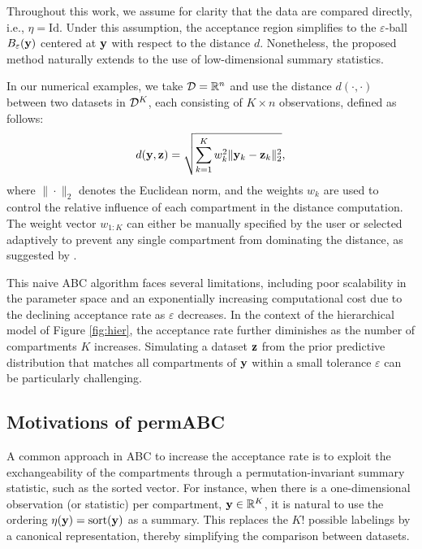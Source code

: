 Throughout this work, we assume for clarity that the data are compared directly, i.e., $\eta = \mathrm{Id}$. Under this assumption, the acceptance region simplifies to the $\varepsilon$-ball $B_{\varepsilon}(\mathbf{y})$ centered at $\mathbf{y}$ with respect to the distance $d$. Nonetheless, the proposed method naturally extends to the use of low-dimensional summary statistics.


In our numerical examples, we take $\mathcal{D} = \mathbb R^n$ and use the distance $d(\cdot,\cdot)$ between two datasets in \( \mathcal{D}^K \), each consisting of \( K \times n \) observations, defined as follows: 
\begin{equation}
    \label{eqdistance}
    d(\mathbf{y}, \mathbf{z}) = \sqrt{\sum_{k=1}^K w_k^2 \| \mathbf{y}_k - \mathbf{z}_k \|_2^2},
\end{equation}
where \( \| \cdot \|_2 \) denotes the Euclidean norm, and the weights \( w_k \) are used to control the relative influence of each compartment in the distance computation. The weight vector \( w_{1:K} \) can either be manually specified by the user or selected adaptively to prevent any single compartment from dominating the distance, as suggested by \citet{prangle2017adapting}.


This naive ABC algorithm faces several limitations, including poor scalability in the parameter space and an exponentially increasing computational cost due to the declining acceptance rate as \( \varepsilon \) decreases. In the context of the hierarchical model of Figure \ref{fig:hier}, the acceptance rate further diminishes as the number of compartments \( K \) increases. Simulating a dataset \( \mathbf{z} \) from the prior predictive distribution that matches all compartments of \( \mathbf{y} \) within a small tolerance \( \varepsilon \) can be particularly challenging. 


\subsection{Motivations of permABC}

A common approach in ABC to increase the acceptance rate is to exploit the exchangeability of the compartments through a permutation-invariant summary statistic, such as the sorted vector. For instance, when there is a one-dimensional observation (or statistic) per compartment, $\mathbf{y} \in \mathbb{R}^K$, it is natural to use the ordering $\eta(\mathbf{y})=\mathrm{sort}(\mathbf{y})$ as a summary. This replaces the $K!$ possible labelings by a canonical representation, thereby simplifying the comparison between datasets.

